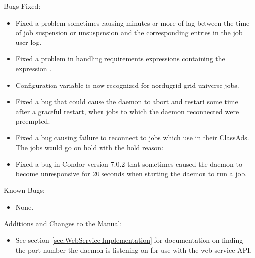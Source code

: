 \noindent Bugs Fixed:

\begin{itemize}

\item Fixed a problem sometimes causing minutes or more of lag between
the time of job suspension or unsuspension and the corresponding entries
in the job user log.

\item Fixed a problem in   handling
requirements expressions containing  the expression .

\item Configuration variable 
is now recognized for nordugrid grid universe jobs.

\item Fixed a bug that could cause the  daemon to abort
and restart some time after a graceful restart,
when jobs to which the  daemon reconnected were preempted.

\item Fixed a bug causing failure to reconnect to jobs which use
in their ClassAds.  The jobs would go on
hold with the hold reason:

\item Fixed a bug in Condor version 7.0.2 that sometimes caused 
the  daemon to become
unresponsive for 20 seconds when starting the  daemon
to run a job.

\end{itemize}

\noindent Known Bugs:

\begin{itemize}

\item None.

\end{itemize}

\noindent Additions and Changes to the Manual:

\begin{itemize}

\item See 
  section~\ref{sec:WebService-Implementation}
  for documentation on finding the port number the  daemon
  is listening on for use with the web service API.

\end{itemize}


